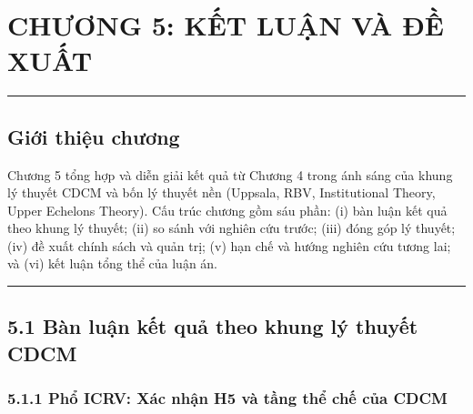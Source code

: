 \documentclass[
  a4paper,
  13pt]{extreport}
\author{}
\date{}
\begin{document}
\hypertarget{chux1b0ux1a1ng-5-kux1ebft-luux1eadn-vuxe0-ux111ux1ec1-xuux1ea5t}{%
\chapter{CHƯƠNG 5: KẾT LUẬN VÀ ĐỀ
XUẤT}\label{chux1b0ux1a1ng-5-kux1ebft-luux1eadn-vuxe0-ux111ux1ec1-xuux1ea5t}}

\begin{center}\rule{0.5\linewidth}{0.5pt}\end{center}

\hypertarget{giux1edbi-thiux1ec7u-chux1b0ux1a1ng}{%
\section{Giới thiệu chương}\label{giux1edbi-thiux1ec7u-chux1b0ux1a1ng}}

Chương 5 tổng hợp và diễn giải kết quả từ Chương 4 trong ánh sáng của
khung lý thuyết CDCM và bốn lý thuyết nền (Uppsala, RBV, Institutional
Theory, Upper Echelons Theory). Cấu trúc chương gồm sáu phần: (i) bàn
luận kết quả theo khung lý thuyết; (ii) so sánh với nghiên cứu trước;
(iii) đóng góp lý thuyết; (iv) đề xuất chính sách và quản trị; (v) hạn
chế và hướng nghiên cứu tương lai; và (vi) kết luận tổng thể của luận
án.

\begin{center}\rule{0.5\linewidth}{0.5pt}\end{center}

\hypertarget{buxe0n-luux1eadn-kux1ebft-quux1ea3-theo-khung-luxfd-thuyux1ebft-cdcm}{%
\section{5.1 Bàn luận kết quả theo khung lý thuyết
CDCM}\label{buxe0n-luux1eadn-kux1ebft-quux1ea3-theo-khung-luxfd-thuyux1ebft-cdcm}}

\hypertarget{phux1ed5-icrv-xuxe1c-nhux1eadn-h5-vuxe0-tux1ea7ng-thux1ec3-chux1ebf-cux1ee7a-cdcm}{%
\subsection{5.1.1 Phổ ICRV: Xác nhận H5 và tầng thể chế của
CDCM}\label{phux1ed5-icrv-xuxe1c-nhux1eadn-h5-vuxe0-tux1ea7ng-thux1ec3-chux1ebf-cux1ee7a-cdcm}}
\end{document}
